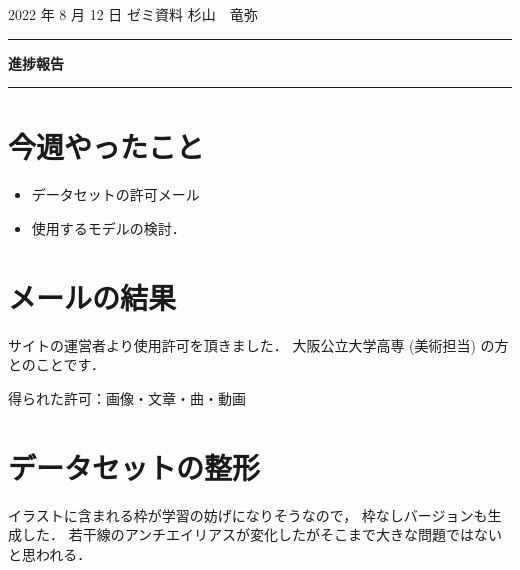 \documentclass[onecolumn]{ujarticle}   %
\begin{document}

		\noindent
		\hspace{1em}
		2022 年 8 月 12 日
		ゼミ資料
		\hfill
		杉山　竜弥
		\vspace{2mm}

		\hrule
		\begin{center}
			{\Large \bf 進捗報告}
		\end{center}
		\hrule
		\vspace{9mm}


\section{今週やったこと}
\begin{itemize}
  \item データセットの許可メール
  \item 使用するモデルの検討．
\end{itemize}


\section{メールの結果}
サイトの運営者より使用許可を頂きました．
大阪公立大学高専 (美術担当) の方とのことです．

得られた許可：画像・文章・曲・動画

%
%
%
%
%

\section{データセットの整形}
イラストに含まれる枠が学習の妨げになりそうなので，
枠なしバージョンも生成した．
若干線のアンチエイリアスが変化したがそこまで大きな問題ではないと思われる．
\end{document}

